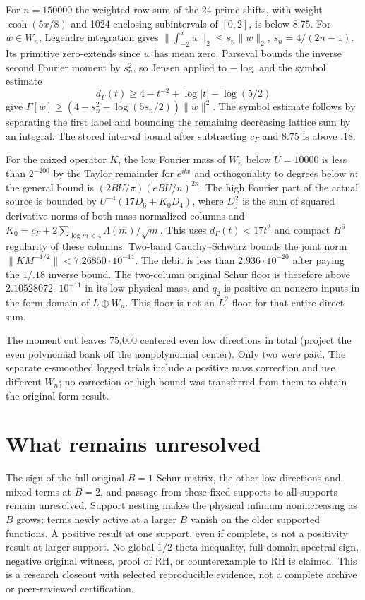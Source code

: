 \documentclass[11pt]{article}
\begin{document}
For $n=150000$ the weighted row sum of the 24 prime shifts, with weight $\cosh(5x/8)$ and 1024 enclosing subintervals of $[0,2]$, is below $8.75$. For $w\in W_n$, Legendre integration gives $\|\int_{-2}^{x}w\|_2\le s_n\|w\|_2$, $s_n=4/(2n-1)$. Its primitive zero-extends since $w$ has mean zero. Parseval bounds the inverse second Fourier moment by $s_n^2$, so Jensen applied to $-\log$ and the symbol estimate
\[
 d_\Gamma(t)\ge4-t^{-2}+\log|t|-\log(5/2)
\]
give $\Gamma[w]\ge(4-s_n^2-\log(5s_n/2))\|w\|^2$. The symbol estimate follows by separating the first label and bounding the remaining decreasing lattice sum by an integral. The stored interval bound after subtracting $c_\Gamma$ and $8.75$ is above $.18$.

For the mixed operator $K$, the low Fourier mass of $W_n$ below $U=10000$ is less than $2^{-200}$ by the Taylor remainder for $e^{itx}$ and orthogonality to degrees below $n$; the general bound is $(2BU/\pi)(eBU/n)^{2n}$. The high Fourier part of the actual source is bounded by $U^{-4}(17D_6+K_0 D_4)$, where $D_j^2$ is the sum of squared derivative norms of both mass-normalized columns and $K_0=c_\Gamma+2\sum_{\log m<4}\Lambda(m)/\sqrt m$. This uses $d_\Gamma(t)<17t^2$ and compact $H^6$ regularity of these columns. Two-band Cauchy--Schwarz bounds the joint norm $\|KM^{-1/2}\|<7.26850\cdot10^{-11}$. The debit is less than $2.936\cdot10^{-20}$ after paying the $1/.18$ inverse bound. The two-column original Schur floor is therefore above $2.10528072\cdot10^{-11}$ in its low physical mass, and $q_2$ is positive on nonzero inputs in the form domain of $L\oplus W_n$. This floor is not an $L^2$ floor for that entire direct sum.

The moment cut leaves 75,000 centered even low directions in total (project the even polynomial bank off the nonpolynomial center). Only two were paid. The separate $\epsilon$-smoothed logged trials include a positive mass correction and use different $W_n$; no correction or high bound was transferred from them to obtain the original-form result.

\section{What remains unresolved}
The sign of the full original $B=1$ Schur matrix, the other low directions and mixed terms at $B=2$, and passage from these fixed supports to all supports remain unresolved. Support nesting makes the physical infimum nonincreasing as $B$ grows; terms newly active at a larger $B$ vanish on the older supported functions. A positive result at one support, even if complete, is not a positivity result at larger support. No global $1/2$ theta inequality, full-domain spectral sign, negative original witness, proof of RH, or counterexample to RH is claimed. This is a research closeout with selected reproducible evidence, not a complete archive or peer-reviewed certification.
\end{document}
